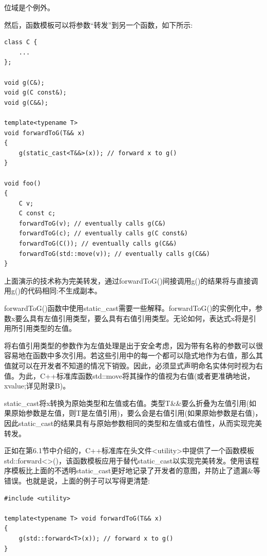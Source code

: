 \begin{tcolorbox}[colback=webgreen!5!white,colframe=webgreen!75!black]
\hspace*{0.75cm}位域是个例外。
\end{tcolorbox}

然后，函数模板可以将参数“转发”到另一个函数，如下所示:

\begin{lstlisting}[style=styleCXX]
class C {
	...
};

void g(C&);
void g(C const&);
void g(C&&);

template<typename T>
void forwardToG(T&& x)
{
	g(static_cast<T&&>(x)); // forward x to g()
}

void foo()
{
	C v;
	C const c;
	forwardToG(v); // eventually calls g(C&)
	forwardToG(c); // eventually calls g(C const&)
	forwardToG(C()); // eventually calls g(C&&)
	forwardToG(std::move(v)); // eventually calls g(C&&)
}
\end{lstlisting}

上面演示的技术称为完美转发，通过forwardToG()间接调用g()的结果将与直接调用g()的代码相同:不生成副本。

forwardToG()函数中使用static\_cast需要一些解释。forwardToG()的实例化中，参数x要么具有左值引用类型，要么具有右值引用类型。无论如何，表达式x将是引用所引用类型的左值。

\begin{tcolorbox}[colback=webgreen!5!white,colframe=webgreen!75!black]
\hspace*{0.75cm}将右值引用类型的参数作为左值处理是出于安全考虑，因为带有名称的参数可以很容易地在函数中多次引用。若这些引用中的每一个都可以隐式地作为右值，那么其值就可以在开发者不知道的情况下销毁。因此，必须显式声明命名实体何时视为右值。为此，C++标准库函数std::move将其操作的值视为右值(或者更准确地说，xvalue;详见附录B)。
\end{tcolorbox}

static\_cast将x转换为原始类型和左值或右值。类型T\&\&要么折叠为左值引用(如果原始参数是左值，则T是左值引用)，要么会是右值引用(如果原始参数是右值)，因此static\_cast的结果具有与原始参数相同的类型和左值或右值性，从而实现完美转发。

正如在第6.1节中介绍的，C++标准库在头文件<utility>中提供了一个函数模板std::forward<>()，该函数模板应用于替代static\_cast以实现完美转发。使用该程序模板比上面的不透明static\_cast更好地记录了开发者的意图，并防止了遗漏\&等错误。也就是说，上面的例子可以写得更清楚:

\begin{lstlisting}[style=styleCXX]
#include <utility>

template<typename T> void forwardToG(T&& x)
{
	g(std::forward<T>(x)); // forward x to g()
}
\end{lstlisting}

